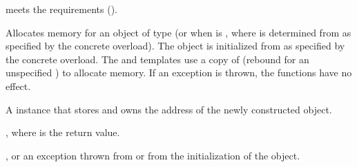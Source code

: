 \begin{itemdescr}
\pnum
\expects
{} meets the  requirements ().

\pnum
\effects
Allocates memory for an object of type 
(or  when  is ,
where  is determined from  as specified by the concrete overload).
The object is initialized from  as specified by the concrete overload.
The  and  templates
use a copy of 
(rebound for an unspecified ) to allocate memory.
If an exception is thrown, the functions have no effect.

\pnum
\returns
A  instance that stores and owns the address of
the newly constructed object.

\pnum
\ensures
{},
where  is the return value.

\pnum
\throws
{}, or
an exception thrown from  or from the initialization of the object.


\end{itemdescr}
